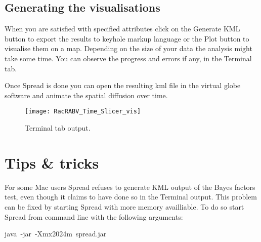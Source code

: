 \subsection{Generating the visualisations}

When you are satisfied with specified attributes click on the Generate
KML button to export the results to keyhole markup language or the
Plot button to visualise them on a map. Depending on the size of your
data the analysis might take some time. You can observe the progress
and errors if any, in the Terminal tab.

Once Spread is done you can open the resulting kml file in the virtual
globe software and animate the spatial diffusion over time.

\begin{figure}[H]
\begin{centering}
\texttt{[image: RacRABV\_Time\_Slicer\_vis]}
\caption{Terminal tab output.}
\label{fig:12}
\par\end{centering}
\end{figure}

\section{Tips \& tricks}

For some Mac users Spread refuses to generate KML output of the Bayes
factors test, even though it claims to have done so in the Terminal
output. This problem can be fixed by starting Spread with more memory
availliable. To do so start Spread from command line with the following
arguments: 

\begin{lyxcode}
java~-jar~-Xmx2024m~spread.jar
\end{lyxcode}